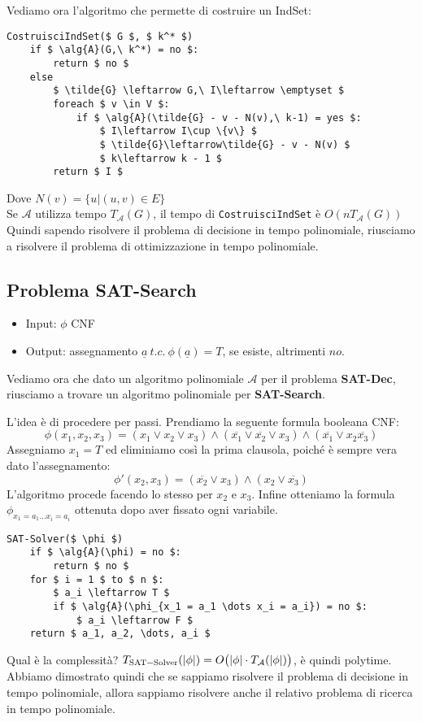 \documentclass[a4paper]{article}
\theoremstyle{definition}
\newcommand{\alg}[1]{\mathcal{#1}}
\begin{document}
		Vediamo ora l'algoritmo che permette di costruire un IndSet:
		
		\begin{lstlisting}[frame=tb, mathescape=true, caption={Algoritmo di Ottimizzazione per IndSet}]
CostruisciIndSet($ G $, $ k^* $)
	if $ \alg{A}(G,\ k^*) = no $:
		return $ no $
	else
		$ \tilde{G} \leftarrow G,\ I\leftarrow \emptyset $
		foreach $ v \in V $:
			if $ \alg{A}(\tilde{G} - v - N(v),\ k-1) = yes $:
				$ I\leftarrow I\cup \{v\} $
				$ \tilde{G}\leftarrow\tilde{G} - v - N(v) $
				$ k\leftarrow k - 1 $
		return $ I $
		\end{lstlisting}
		Dove $ N(v) = \{u\big| (u, v) \in E \} $\\
		Se $ \alg{A} $ utilizza tempo $ T_{\alg{A}}(G) $, il tempo di \lstinline|CostruisciIndSet| è $ O(nT_{\alg{A}}(G)) $\\
		Quindi sapendo risolvere il problema di decisione in tempo polinomiale, riusciamo a risolvere il problema di ottimizzazione in tempo polinomiale.
		
	\subsection{Problema SAT-Search}
		\begin{itemize}
			\item Input: $ \phi $ CNF
			\item Output: assegnamento $ \underline{a}\ t.c.\ \phi(\underline{a}) = T $, se esiste, altrimenti $ no $.
		\end{itemize}
		Vediamo ora che dato un algoritmo polinomiale $ \alg{A} $ per il problema \textbf{SAT-Dec}, riusciamo a trovare un algoritmo polinomiale per \textbf{SAT-Search}.
		
		L'idea è di procedere per passi. Prendiamo la seguente formula booleana CNF:
		\[
			\phi(x_1, x_2, x_3) = (x_1\vee x_2\vee x_3)\wedge(\overline{x_1}\vee\overline{x_2}\vee x_3)\wedge(\overline{x_1}\vee x_2\overline{x_3})
		\]
		Assegniamo $ x_1 = T $ ed eliminiamo così la prima clausola, poiché è sempre vera dato l'assegnamento:
		\[
			\phi'(x_2, x_3) = (\overline{x_2}\vee x_3)\wedge(x_2\vee \overline{x_3})
		\]
		L'algoritmo procede facendo lo stesso per $ x_2 $ e $ x_3 $. Infine otteniamo la formula $ \phi_{x_1 = a_1 \dots x_i = a_i} $ ottenuta dopo aver fissato ogni variabile.
		
		\begin{lstlisting}[frame = tb, mathescape=true, caption={Algoritmo di Ricerca per SAT}, label={lst:algo5}]
SAT-Solver($ \phi $)
	if $ \alg{A}(\phi) = no $:
		return $ no $
	for $ i = 1 $ to $ n $:
		$ a_i \leftarrow T $
		if $ \alg{A}(\phi_{x_1 = a_1 \dots x_i = a_i}) = no $:
			$ a_i \leftarrow F $
	return $ a_1, a_2, \dots, a_i $
		\end{lstlisting}
		Qual è la complessità? 
		$ T_{\text{\lstinline|SAT-Solver|}}(\vert \phi \vert) = O \big(\vert\phi \vert\cdot T_{\alg{A}}(\vert \phi \vert) \big) $, è quindi polytime.\\
		Abbiamo dimostrato quindi che se sappiamo risolvere il problema di decisione in tempo polinomiale, allora sappiamo risolvere anche il relativo problema di ricerca in tempo polinomiale.
		
\end{document}

